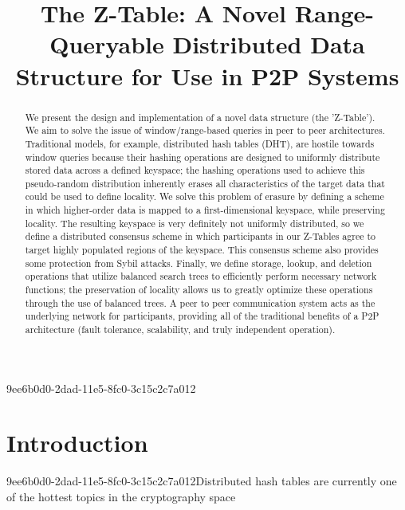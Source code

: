 \documentclass[12pt]{article}
\title{The Z-Table: A Novel Range-Queryable Distributed Data Structure for Use in P2P Systems}
\begin{document}
\maketitle

\begin{abstract}
We present the design and implementation of a novel data structure (the 'Z-Table'). We aim to solve the issue of window/range-based queries in peer to peer architectures. Traditional models, for example,  distributed hash tables (DHT), are hostile towards window queries because their hashing operations are designed to uniformly distribute stored data across a defined keyspace; the hashing operations used to achieve this pseudo-random distribution inherently erases all characteristics of the target data that could be used to define locality. We solve this problem of erasure by defining a scheme in which higher-order data is mapped to a first-dimensional keyspace, while preserving locality. The resulting keyspace is very definitely not uniformly distributed, so we define a distributed consensus scheme in which participants in our Z-Tables agree to target highly populated regions of the keyspace. This consensus scheme also provides some protection from Sybil attacks. Finally, we define storage, lookup, and deletion operations that utilize balanced search trees to efficiently perform necessary network functions; the preservation of locality allows us to greatly optimize these operations through the use of balanced trees. A peer to peer communication system acts as the underlying network for participants, providing all of the traditional benefits of a P2P architecture (fault tolerance, scalability, and truly independent operation).
\end{abstract}

9ee6b0d0-2dad-11e5-8fc0-3c15c2c7a012
\newpage
\section{Introduction}
9ee6b0d0-2dad-11e5-8fc0-3c15c2c7a012Distributed hash tables are currently one of the hottest topics in the cryptography space~\cite{Stoica:2001dj,Rowstron:2001ea,Ratnasamy:2001wn}

\printbibliography
\end{document}
